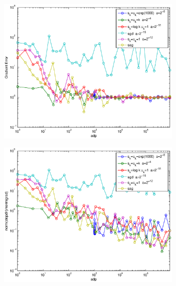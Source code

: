 \documentclass[12pt]{article}
\begin{document}
\begin{figure}[H]
	\begin{subfigure}[b]{.5\linewidth}
		        \includegraphics[width=4in]{Figures/19-2-3.eps}
	\end{subfigure}%
	\begin{subfigure}[b]{.5\linewidth}
		        \includegraphics[width=4in]{Figures/19-2-4.eps}
	\end{subfigure}%
	\end{figure}
	
\end{document}
